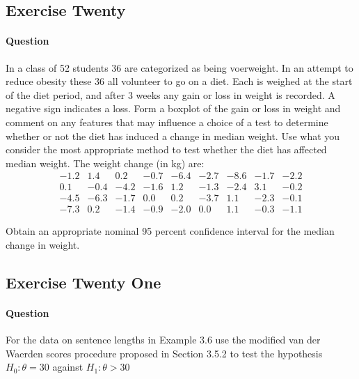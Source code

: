 \documentclass[]{article}
\let\oldparagraph\paragraph
\renewcommand{\paragraph}[1]{\oldparagraph{#1}\mbox{}}
\begin{document}
\subsection{Exercise Twenty}\label{exercise-twenty}

\paragraph{Question}\label{question-19}

In a class of 52 students 36 are categorized as being voerweight. In an
attempt to reduce obesity these 36 all volunteer to go on a diet. Each
is weighed at the start of the diet period, and after 3 weeks any gain
or loss in weight is recorded. A negative sign indicates a loss. Form a
boxplot of the gain or loss in weight and comment on any features that
may influence a choice of a test to determine whether or not the diet
has induced a change in median weight. Use what you consider the most
appropriate method to test whether the diet has affected median weight.
The weight change (in kg) are: \[\begin{array}
{cccccccccc}
-1.2 & 1.4 & 0.2 & -0.7 & -6.4 & -2.7 & -8.6 & -1.7 & -2.2\\
0.1 & -0.4 & -4.2 & -1.6 & 1.2 & -1.3 & -2.4 & 3.1 & -0.2\\
-4.5 & -6.3 & -1.7 & 0.0 & 0.2 & -3.7 & 1.1 & -2.3 & -0.1\\
-7.3 & 0.2 & -1.4 & -0.9 & -2.0 & 0.0 & 1.1 & -0.3 & -1.1
\end{array}
\]

Obtain an appropriate nominal 95 percent confidence interval for the
median change in weight.

\subsection{Exercise Twenty One}\label{exercise-twenty-one}

\paragraph{Question}\label{question-20}

For the data on sentence lengths in Example 3.6 use the modified van der
Waerden scores procedure proposed in Section 3.5.2 to test the
hypothesis \(H_0: \theta = 30\) against \(H_1: \theta > 30\)
\end{document}
